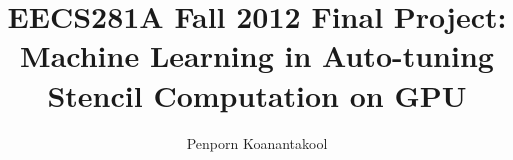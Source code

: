 \documentclass{article}
\title{EECS281A Fall 2012 Final Project: \\ Machine Learning in Auto-tuning Stencil Computation on GPU}
\author{Penporn Koanantakool}
\begin{document}
\maketitle











\pagebreak




\end{document}
